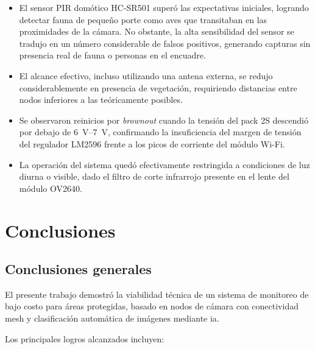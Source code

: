 \documentclass[a4paper, 12pt]{report}
\begin{document}
\begin{itemize}
  \item El sensor PIR domótico HC-SR501 superó las expectativas iniciales, logrando detectar fauna de pequeño porte como aves que transitaban en las proximidades de la cámara. No obstante, la alta sensibilidad del sensor se tradujo en un número considerable de falsos positivos, generando capturas sin presencia real de fauna o personas en el encuadre.
  \item El alcance efectivo, incluso utilizando una antena externa, se redujo considerablemente en presencia de vegetación, requiriendo distancias entre nodos inferiores a las teóricamente posibles.
  \item Se observaron reinicios por \textit{brownout} cuando la tensión del pack 2S descendió por debajo de \qtyrange{6}{7}{V}, confirmando la insuficiencia del margen de tensión del regulador LM2596 frente a los picos de corriente del módulo Wi-Fi.
  \item La operación del sistema quedó efectivamente restringida a condiciones de luz diurna o visible, dado el filtro de corte infrarrojo presente en el lente del módulo OV2640.
\end{itemize}

\chapter{Conclusiones}

\section{Conclusiones generales}

El presente trabajo demostró la viabilidad técnica de un sistema de
monitoreo de bajo costo para áreas protegidas, basado en nodos de cámara
con conectividad \gls{mesh} y clasificación automática de imágenes
mediante \gls{ia}.

Los principales logros alcanzados incluyen:
\end{document}
